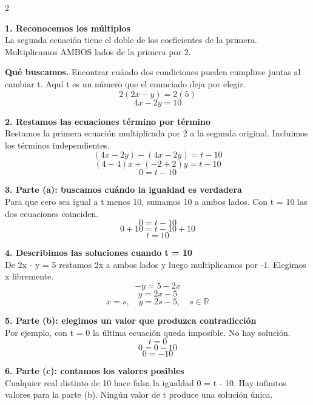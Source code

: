 \documentclass[11pt,a4paper,landscape]{article}
\begin{document}
\begin{multicols*}{2}
\noindent\begin{minipage}{\linewidth}\textbf{1. Reconocemos los múltiplos}\\[2pt]La segunda ecuación tiene el doble de los coeficientes de la primera. Multiplicamos AMBOS lados de la primera por 2.
\par\smallskip\textbf{Qué buscamos.} Encontrar cuándo dos condiciones pueden cumplirse juntas al cambiar t. Aquí t es un número que el enunciado deja por elegir.
\[2(2x-y)=2(5)\]
\[4x-2y=10\]
\end{minipage}\par\medskip
\noindent\begin{minipage}{\linewidth}\textbf{2. Restamos las ecuaciones término por término}\\[2pt]Restamos la primera ecuación multiplicada por 2 a la segunda original. Incluimos los términos independientes.
\[(4x-2y)-(4x-2y)=t-10\]
\[(4-4)x+(-2+2)y=t-10\]
\[0=t-10\]
\end{minipage}\par\medskip
\noindent\begin{minipage}{\linewidth}\textbf{3. Parte (a): buscamos cuándo la igualdad es verdadera}\\[2pt]Para que cero sea igual a t menos 10, sumamos 10 a ambos lados. Con t = 10 las dos ecuaciones coinciden.
\[0=t-10\]
\[0+10=t-10+10\]
\[t=10\]
\end{minipage}\par\medskip
\noindent\begin{minipage}{\linewidth}\textbf{4. Describimos las soluciones cuando t = 10}\\[2pt]De 2x - y = 5 restamos 2x a ambos lados y luego multiplicamos por -1. Elegimos x libremente.
\[-y=5-2x\]
\[y=2x-5\]
\[x=s,\quad y=2s-5,\quad s\in\mathbb{R}\]
\end{minipage}\par\medskip
\noindent\begin{minipage}{\linewidth}\textbf{5. Parte (b): elegimos un valor que produzca contradicción}\\[2pt]Por ejemplo, con t = 0 la última ecuación queda imposible. No hay solución.
\[t=0\]
\[0=0-10\]
\[0=-10\]
\end{minipage}\par\medskip
\noindent\begin{minipage}{\linewidth}\textbf{6. Parte (c): contamos los valores posibles}\\[2pt]Cualquier real distinto de 10 hace falsa la igualdad 0 = t - 10. Hay infinitos valores para la parte (b). Ningún valor de t produce una solución única.

\end{minipage}
\end{multicols*}
\end{document}
